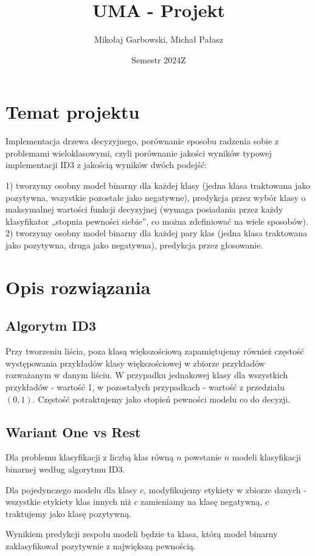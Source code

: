 \documentclass{article}
\title{UMA - Projekt}
\author{Mikołaj Garbowski, Michał Pałasz}
\date{Semestr 2024Z}
\begin{document}
\maketitle

\section{Temat projektu}
Implementacja drzewa decyzyjnego, porównanie sposobu radzenia sobie z problemami wieloklasowymi,
czyli porównanie jakości wyników typowej implementacji ID3 z jakością wyników dwóch podejść:

1) tworzymy osobny model binarny dla każdej klasy (jedna klasa traktowana jako pozytywna, wszystkie pozostałe jako negatywne),
predykcja przez wybór klasy o maksymalnej wartości funkcji decyzyjnej (wymaga posiadania przez każdy klasyfikator
„stopnia pewności siebie”, co można zdefiniować na wiele sposobów).
2) tworzymy osobny model binarny dla każdej pary klas (jedna klasa traktowana jako pozytywna, druga jako negatywna),
predykcja przez głosowanie.

\section{Opis rozwiązania}

\subsection{Algorytm ID3}
Przy tworzeniu liścia, poza klasą większościową zapamiętujemy również częstość występowania przykładów klasy większościowej
w zbiorze przykładów rozważanym w danym liściu.
W przypadku jednakowej klasy dla wszystkich przykładów - wartość 1, w pozostałych przypadkach - wartość z przedziału $(0,1)$.
Częstość potraktujemy jako stopień pewności modelu co do decyzji.

\subsection{Wariant One vs Rest}
Dla problemu klasyfikacji z liczbą klas równą $n$ powstanie $n$ modeli klasyfikacji binarnej według algorytmu ID3.

Dla pojedynczego modelu dla klasy $c$, modyfikujemy etykiety w zbiorze danych - wszystkie etykiety klas innych niż $c$ zamieniamy na klasę negatywną, $c$ traktujemy jako klasę pozytywną.

Wynikiem predykcji zespołu modeli będzie ta klasa, którą model binarny zaklasyfikował pozytywnie z największą pewnością.
\end{document}
